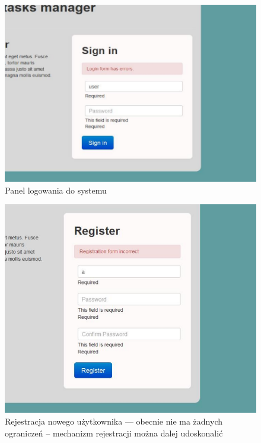 \documentclass[a4paper,12pt,notitlepage]{mwrep}
\begin{document}
\begin{figure}[H]
\centering
\includegraphics[scale=0.38]{images/app/1.png}
\caption{Panel logowania do systemu}
\label{fig:app_login}
\end{figure}

\begin{figure}[H]
\centering
\includegraphics[scale=0.43]{images/app/2.png}
\caption{Rejestracja nowego użytkownika --- obecnie nie ma żadnych ograniczeń -- mechanizm rejestracji można dalej udoskonalić}
\label{fig:app_register}
\end{figure}
\end{document}
